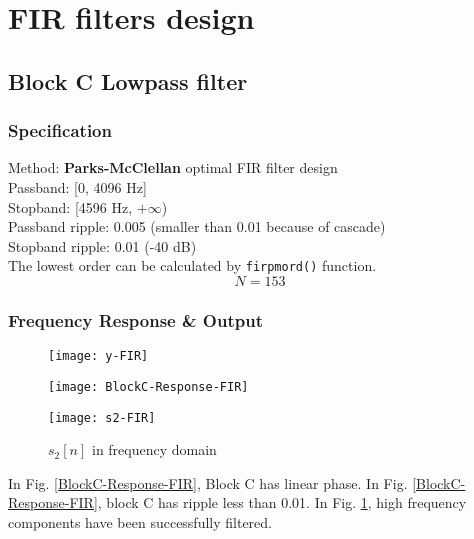 \documentclass{article}
\newenvironment{homeworkProblem}[1]{
	\section{#1}
	}{
}
\newenvironment{homeworkSection}[1]{
	\subsection{#1}
	}{
}
\begin{document}
\begin{homeworkProblem}{FIR filters design}
\begin{homeworkSection}{Block C Lowpass filter}
\subsubsection{Specification}
Method: \textbf{Parks-McClellan} optimal FIR filter design\\
Passband: [0, 4096 Hz]\\
Stopband: [4596 Hz, $+\infty$)\\
Passband ripple: 0.005 (smaller than 0.01 because of cascade)\\
Stopband ripple: 0.01 (-40 dB)\\

The lowest order can be calculated by \texttt{firpmord()} function.
\begin{equation}
N = 153
\end{equation}


\subsubsection{Frequency Response \& Output}
\begin{figure}[H]
\begin{minipage}[t]{0.33\linewidth}
\centering
\texttt{[image: y-FIR]}
\caption{$\tilde{s}_2[n]$ multiplied by carrier}
\label{y-FIR}
\end{minipage}
\begin{minipage}[t]{0.33\linewidth}
\centering
\texttt{[image: BlockC-Response-FIR]}
\caption{Block C response}
\label{BlockC-Response-FIR}
\end{minipage}
\begin{minipage}[t]{0.33\linewidth}
\centering
\texttt{[image: s2-FIR]}
\caption{$s_2[n]$ in frequency domain}
\label{s2-FIR}
\end{minipage}
\end{figure}

In Fig. \ref{BlockC-Response-FIR}, Block C has linear phase. In Fig. \ref{BlockC-Response-FIR}, block C has ripple less than 0.01. In Fig. \ref{s2-FIR}, high frequency components have been successfully filtered.

\end{homeworkSection}


\end{homeworkProblem}

\end{document}
